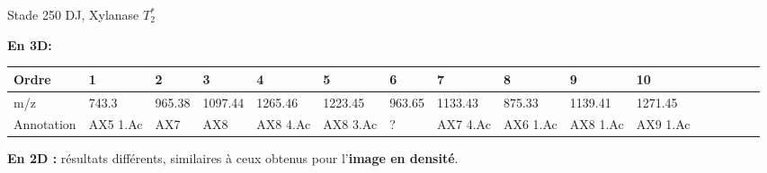 \documentclass[10pt]{beamer}
\begin{document}
\begin{frame}{Stade 250 DJ, Xylanase}
  \textbf{$T_2^*$}

  \textbf{En 3D:}
  \vspace{-0.4cm}
  \begin{table}[]
    \centering
    \begin{adjustbox}{max width=1\textwidth}
      \begin{tabular}{llllllllllllllll}
        \toprule
        Ordre & 1       & 2       & 3       & 4       & 5       & 6       & 7       & 8       & 9       & 10       \\
        \midrule
        m/z &    743.3 & 965.38 & 1097.44 & 1265.46 & 1223.45 & 963.65 & 1133.43 & 875.33 & 1139.41 & 1271.45 \\
        Annotation & AX5 1.Ac & AX7 & AX8 & AX8 4.Ac & AX8 3.Ac & ? & AX7 4.Ac & AX6 1.Ac & AX8 1.Ac & AX9 1.Ac \\
        \bottomrule
      \end{tabular}
    \end{adjustbox}
  \end{table}

  \textbf{En 2D :} résultats différents, similaires à ceux obtenus pour l'\textbf{image en densité}.


\end{frame}
\end{document}
